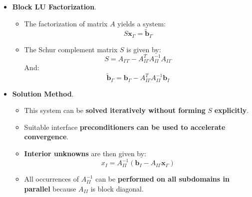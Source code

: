 \begin{itemize}
    \item \textbf{Block LU Factorization}. 
    \begin{itemize}
        \item The factorization of matrix $A$ yields a system:
        \begin{equation*}
            S \mathbf{x}_{\Gamma} = \widetilde{\mathbf{b}}_{\Gamma}
        \end{equation*}

        \item The Schur complement matrix $S$ is given by:
        \begin{equation*}
            S = A_{\Gamma \Gamma} - A_{I\Gamma}^T A_{II}^{-1} A_{I\Gamma}
        \end{equation*}
        And:
        \begin{equation*}
            \widetilde{\mathbf{b}}_{\Gamma} = \mathbf{b}_{\Gamma} - A_{I\Gamma}^{T} A_{II}^{-1} \mathbf{b}_{I}
        \end{equation*}
    \end{itemize}

    \item \textbf{Solution Method}.
    \begin{itemize}
        \item This system can be \textbf{solved iteratively without forming} $S$ \textbf{explicitly}.
        \item Suitable interface \textbf{preconditioners can be used to accelerate convergence}.
        \item \textbf{Interior unknowns} are then given by:
        \begin{equation*}
            x_{I} = A_{II}^{-1} (\mathbf{b}_{I} - A_{I\Gamma} \mathbf{x}_{\Gamma})
        \end{equation*}
        \item All occurrences of $A_{II}^{-1}$ can be \textbf{performed on all subdomains in parallel} because $A_{II}$ is block diagonal.
    \end{itemize}
\end{itemize}

